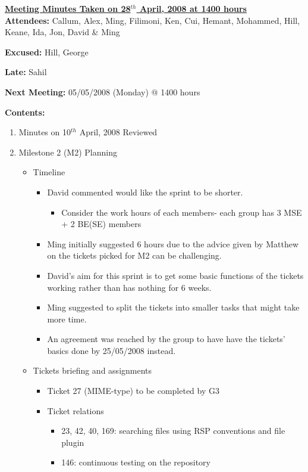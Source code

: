 \documentclass{letter}
\begin{document}
{\large \textbf{\underline{Meeting Minutes Taken on 28$^{th}$ April, 2008 at 1400 hours}}}\\

\textbf{Attendees:} Callum, Alex, Ming, Filimoni, Ken, Cui, Hemant, Mohammed, Hill, Keane, Ida, Jon, David \& Ming 

\textbf{Excused:} Hill, George

\textbf{Late:} Sahil

\textbf{Next Meeting:} 05/05/2008 (Monday) @ 1400 hours

\textbf{Contents:}

\begin{enumerate}
	\item Minutes on 10$^{th}$ April, 2008 Reviewed
	\item Milestone 2 (M2) Planning
		\begin{itemize}
			\item Timeline
				\begin{itemize}
					\item David commented would like the sprint to be shorter.
					\begin{itemize}
						\item Consider the work hours of each members- each group has 3 MSE + 2 BE(SE) members
					\end{itemize}
					\item Ming initially suggested 6 hours due to the advice given by Matthew on the tickets picked for M2 can be challenging. 
					\item David's aim for this sprint is to get some basic functions of the tickets working rather than has nothing for 6 weeks.
					\item Ming suggested to split the tickets into smaller tasks that might take more time. 
					\item An agreement was reached by the group to have have the tickets' basics done by 25/05/2008 instead.
				\end{itemize}
			\item Tickets briefing and assignments
				\begin{itemize}
					\item Ticket 27 (MIME-type) to be completed by G3
					\item Ticket relations
						\begin{itemize}
							\item 23, 42, 40, 169: searching files using RSP conventions and file plugin
							\item 146: continuous testing on the repository

\end{itemize}
\end{itemize}
\end{itemize}
\end{enumerate}
\end{document}
